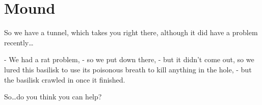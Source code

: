 \section{Mound}

So we have a tunnel, which takes you right there, although it did have a problem recently\ldots

- We had a rat problem,
- so we put  down there,
- but it didn't come out, so we lured this basilisk to use its poisonous breath to kill anything in the hole,
- but the basilisk crawled in once it finished.

So\ldots do you think you can help?
